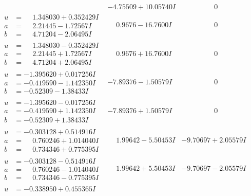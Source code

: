 \documentclass[1p]{elsarticle_modified}
\theoremstyle{definition}
\begin{document}
$$\begin{array}{c|c|c}
 & -4.75509 + 10.05740 I & \phantom{-0.000000 } 0 \\ \hline\begin{aligned}
u &= \phantom{-}1.348030 + 0.352429 I \\
a &= \phantom{-}2.21445 - 1.72567 I \\
b &= \phantom{-}4.71204 - 2.06495 I\end{aligned}
 & \phantom{-}0.9676 - 16.7600 I & \phantom{-0.000000 } 0 \\ \hline\begin{aligned}
u &= \phantom{-}1.348030 - 0.352429 I \\
a &= \phantom{-}2.21445 + 1.72567 I \\
b &= \phantom{-}4.71204 + 2.06495 I\end{aligned}
 & \phantom{-}0.9676 + 16.7600 I & \phantom{-0.000000 } 0 \\ \hline\begin{aligned}
u &= -1.395620 + 0.017256 I \\
a &= -0.419590 - 1.142350 I \\
b &= -0.52309 - 1.38433 I\end{aligned}
 & -7.89376 - 1.50579 I & \phantom{-0.000000 } 0 \\ \hline\begin{aligned}
u &= -1.395620 - 0.017256 I \\
a &= -0.419590 + 1.142350 I \\
b &= -0.52309 + 1.38433 I\end{aligned}
 & -7.89376 + 1.50579 I & \phantom{-0.000000 } 0 \\ \hline\begin{aligned}
u &= -0.303128 + 0.514916 I \\
a &= \phantom{-}0.760246 + 1.014040 I \\
b &= \phantom{-}0.734346 + 0.775395 I\end{aligned}
 & \phantom{-}1.99642 - 5.50453 I & -9.70697 + 2.05579 I \\ \hline\begin{aligned}
u &= -0.303128 - 0.514916 I \\
a &= \phantom{-}0.760246 - 1.014040 I \\
b &= \phantom{-}0.734346 - 0.775395 I\end{aligned}
 & \phantom{-}1.99642 + 5.50453 I & -9.70697 - 2.05579 I \\ \hline\begin{aligned}
u &= -0.338950 + 0.455365 I \\

\end{aligned}
\end{array}$$
\end{document}
